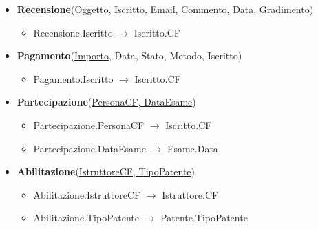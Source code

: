 \documentclass[10pt,twoside]{article}
\begin{document}
{{\begin{itemize}
\begin{itemize}
            \end{itemize}
            \item \textbf{Recensione}(\underline{Oggetto, Iscritto}, Email, Commento, Data, Gradimento)
            \begin{itemize}
                \item Recensione.Iscritto $\rightarrow$ Iscritto.CF
            \end{itemize}
            \item \textbf{Pagamento}(\underline{Importo}, Data, Stato, Metodo, Iscritto)
            \begin{itemize}
                \item Pagamento.Iscritto $\rightarrow$ Iscritto.CF
            \end{itemize}
            \item \textbf{Partecipazione}(\underline{PersonaCF, DataEsame})
            \begin{itemize}
                \item Partecipazione.PersonaCF $\rightarrow$ Iscritto.CF
                \item Partecipazione.DataEsame $\rightarrow$ Esame.Data
            \end{itemize}
            \item \textbf{Abilitazione}(\underline{IstruttoreCF, TipoPatente})
            \begin{itemize}
                \item Abilitazione.IstruttoreCF $\rightarrow$ Istruttore.CF
                \item Abilitazione.TipoPatente $\rightarrow$ Patente.TipoPatente
            \end{itemize}
        \end{itemize}
    }
}
\end{document}
